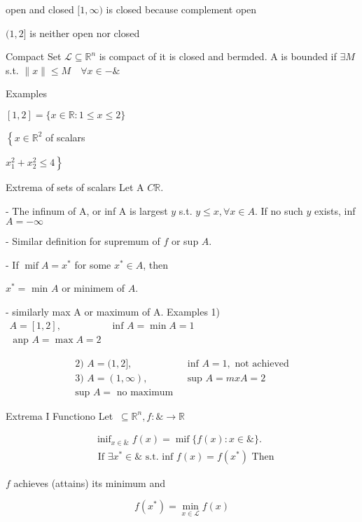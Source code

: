 \documentclass[11pt,a4paper]{article}
\begin{document}
open and closed $[1, \infty)$ is closed because complement open

$(1,2]$ is neither open nor closed

Compact Set $\mathcal{L} \subseteq \mathbb{R}^{n}$ is compact of it is closed and bermded. A is bounded if $\exists M$ s.t. $\|x\| \leqslant M \quad \forall x \in-\&$

Examples

$[1,2]=\{x \in \mathbb{R}: 1 \leqslant x \leqslant 2\}$

$\left\{x \in \mathbb{R}^{2}\right.$
of scalars

$\left.x_{1}^{2}+x_{2}^{2} \leqslant 4\right\}$

Extrema of sets of scalars Let A $C \mathbb{R}$.

- The infinum of A, or inf A is largest $y$ s.t. $y \leqslant x, \forall x \in A$. If no such $y$ exists, inf $A=-\infty$

- Similar definition for supremum of $f$ or sup $A$.

- If $\operatorname{mif} A=x^{*}$ for some $x^{*} \in A$, then

$x^{*}=$ min $A$ or minimem of $A$.

- similarly max A or maximum of A. Examples 1) $\begin{aligned} A=[1,2], & \text { inf } A=\min A=1 \\ \text { anp } A=\max A=2 \end{aligned}$

$$
\begin{array}{ll}
\text { 2) } A=(1,2], & \text { inf } A=1, \text { not achieved } \\
\text { 3) } A=(1, \infty), & \text { sup } A=m x A=2 \\
\text { sup } A=\text { no maximum } &
\end{array}
$$

Extrema I Functiono Let $\ \subseteq \mathbb{R}^{n}, f: \& \rightarrow \mathbb{R}$

$$
\begin{aligned}
&\operatorname{inif}_{x \in \&} f(x)=\operatorname{mif}\{f(x): x \in \&\} . \\
&\text { If } \exists x^{*} \in \& \text { s.t. inf } f(x)=f\left(x^{*}\right) \text { Then }
\end{aligned}
$$

$f$ achieves (attains) its minimum and

$$
f\left(x^{*}\right)=\min _{x \in \mathcal{L}} f(x)
$$
\end{document}

